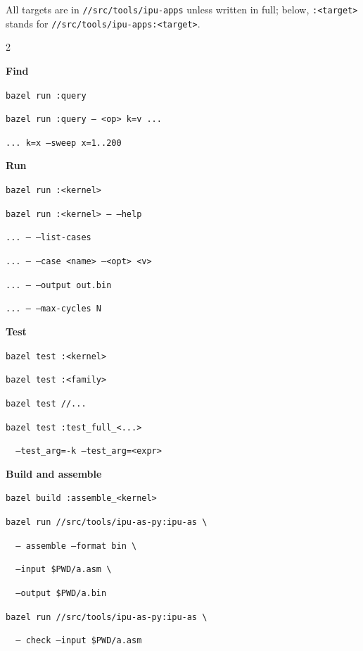 \documentclass[11pt,a4paper]{article}
\begin{document}
\begin{tcolorbox}[enhanced, colback=white, colframe=muted, boxrule=0.8pt, arc=4pt,
  left=10pt, right=10pt, top=8pt, bottom=10pt]
{\small
All targets are in \texttt{//src/tools/ipu-apps} unless written in full;
below, \texttt{:<target>} stands for \texttt{//src/tools/ipu-apps:<target>}.

\raggedcolumns
\begin{multicols}{2}
\raggedright
\textbf{\sffamily Find}\par
\texttt{bazel run :query}\par
\texttt{bazel run :query -- <op> k=v ...}\par
\texttt{... k=x --sweep x=1..200}\par

\medskip\textbf{\sffamily Run}\par
\texttt{bazel run :<kernel>}\par
\texttt{bazel run :<kernel> -- --help}\par
\texttt{... -- --list-cases}\par
\texttt{... -- --case <name> --<opt> <v>}\par
\texttt{... -- --output out.bin}\par
\texttt{... -- --max-cycles N}\par

\medskip\textbf{\sffamily Test}\par
\texttt{bazel test :<kernel>}\par
\texttt{bazel test :<family>}\par
\texttt{bazel test //...}\par
\texttt{bazel test :test\_full\_<...>}\par
\texttt{\ \ --test\_arg=-k --test\_arg=<expr>}\par

\medskip\textbf{\sffamily Build and assemble}\par
\texttt{bazel build :assemble\_<kernel>}\par
\texttt{bazel run //src/tools/ipu-as-py:ipu-as \textbackslash}\par
\texttt{\ \ -- assemble --format bin \textbackslash}\par
\texttt{\ \ --input \$PWD/a.asm \textbackslash}\par
\texttt{\ \ --output \$PWD/a.bin}\par
\texttt{bazel run //src/tools/ipu-as-py:ipu-as \textbackslash}\par
\texttt{\ \ -- check --input \$PWD/a.asm}\par


\end{multicols}}
\end{tcolorbox}
\end{document}

